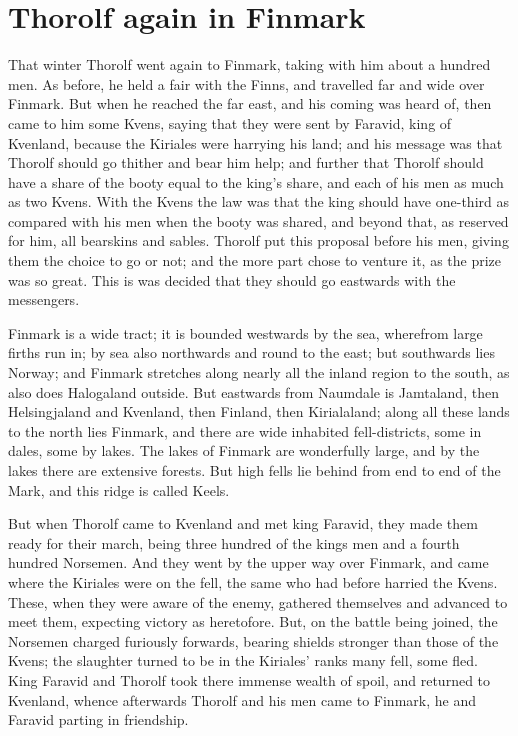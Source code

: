\chapter{Thorolf again in Finmark}
That winter Thorolf went again to Finmark, taking with him about a hundred men. As before, he held a fair with the Finns, and travelled far and wide over Finmark. But when he reached the far east, and his coming was heard of, then came to him some Kvens, saying that they were sent by Faravid, king of Kvenland, because the Kiriales were harrying his land; and his message was that Thorolf should go thither and bear him help; and further that Thorolf should have a share of the booty equal to the king's share, and each of his men as much as two Kvens. With the Kvens the law was that the king should have one-third as compared with his men when the booty was shared, and beyond that, as reserved for him, all bearskins and sables. Thorolf put this proposal before his men, giving them the choice to go or not; and the more part chose to venture it, as the prize was so great. This is was decided that they should go eastwards with the messengers.

Finmark is a wide tract; it is bounded westwards by the sea, wherefrom large firths run in; by sea also northwards and round to the east; but southwards lies Norway; and Finmark stretches along nearly all the inland region to the south, as also does Halogaland outside. But eastwards from Naumdale is Jamtaland, then Helsingjaland and Kvenland, then Finland, then Kirialaland; along all these lands to the north lies Finmark, and there are wide inhabited fell-districts, some in dales, some by lakes. The lakes of Finmark are wonderfully large, and by the lakes there are extensive forests. But high fells lie behind from end to end of the Mark, and this ridge is called Keels.

But when Thorolf came to Kvenland and met king Faravid, they made them ready for their march, being three hundred of the kings men and a fourth hundred Norsemen. And they went by the upper way over Finmark, and came where the Kiriales were on the fell, the same who had before harried the Kvens. These, when they were aware of the enemy, gathered themselves and advanced to meet them, expecting victory as heretofore. But, on the battle being joined, the Norsemen charged furiously forwards, bearing shields stronger than those of the Kvens; the slaughter turned to be in the Kiriales' ranks many fell, some fled. King Faravid and Thorolf took there immense wealth of spoil, and returned to Kvenland, whence afterwards Thorolf and his men came to Finmark, he and Faravid parting in friendship.

